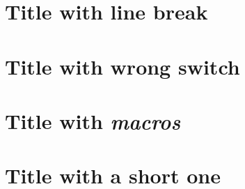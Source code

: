 \documentclass{article}
\begin{document}
\section{Title with
line break}
\section{Title with \texorpdfstring{wrong}{pdf} switch}
\section{Title with \textit{macros}}
\section[Short]{Title with a short one}
\end{document}
